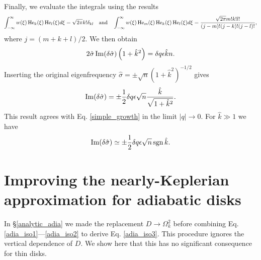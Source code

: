Finally, we evaluate the integrals using the results
\begin{align}
  \int_{-\infty}^{\infty}
  w(\xi) \operatorname{He}_k(\xi)\operatorname{He}_l(\xi) d\xi = \sqrt{2\pi}k!\delta_{kl} \quad
\text{and} \quad
  \int_{-\infty}^{\infty}
  w(\xi) \operatorname{He}_m(\xi)\operatorname{He}_k(\xi)\operatorname{He}_l(\xi) d\xi =
  \frac{\sqrt{2\pi}m!k!l!}{(j-m)!(j-k)!(j-l)!}, 
\end{align}
where $j = (m+k+l)/2$. We then obtain
 \begin{align}
   2\hat{\sigma}\operatorname{Im}(\delta\hat{\sigma})
  \left(1+\hat{k}^2\right) = \delta q \epsilon \hat{k} n.
 \end{align}
Inserting the original eigenfrequency $\hat{\sigma} = \pm
\sqrt{n}(1+\hat{k}^2)^{-1/2}$ gives
\begin{align}
  \operatorname{Im}(\delta\hat{\sigma})= \pm \frac{1}{2}\delta q \epsilon
  \sqrt{n} \frac{\hat{k}}{\sqrt{1+\hat{k}^2}}. 
\end{align}
This result agrees with Eq. \ref{simple_growth} in the limit
$|q|\to0$. 
For $\hat{k}\gg 1$ we have
\begin{align}
  \operatorname{Im}(\delta\hat{\sigma})\simeq \pm \frac{1}{2}\delta q \epsilon
  \sqrt{n} \operatorname{sgn}{\hat{k}}. 
\end{align}

\section{Improving the nearly-Keplerian approximation for adiabatic
  disks}\label{adia_improve}
In \S\ref{analytic_adia} we made the replacement $D\to\Omega_k^2$
before combining Eq. \ref{adia_iso1}---\ref{adia_iso2} to derive
Eq. \ref{adia_iso3}. This procedure ignores the vertical dependence of
$D$. We show here that this has no significant consequence for thin
disks. 

